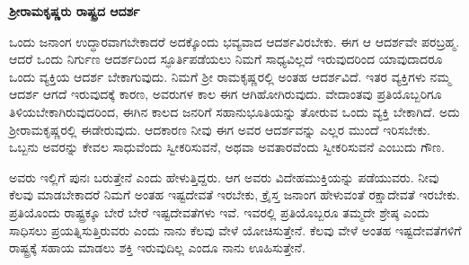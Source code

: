\vskip 5pt

\centerline{\textbf{ಶ‍್ರೀರಾಮಕೃಷ್ಣರು ರಾಷ್ಟ್ರದ ಆದರ್ಶ}}

\vskip 5pt

ಒಂದು ಜನಾಂಗ ಉದ್ಧಾರವಾಗಬೇಕಾದರೆ ಅದಕ್ಕೊಂದು ಭವ್ಯವಾದ ಆದರ್ಶವಿರಬೇಕು. ಈಗ ಆ ಆದರ್ಶವೇ ಪರಬ್ರಹ್ಮ. ಆದರೆ ಒಂದು ನಿರ್ಗುಣ ಆದರ್ಶದಿಂದ ಸ್ಫೂರ್ತಿಪಡೆಯಲು ನಿಮಗೆ ಸಾಧ್ಯವಿಲ್ಲದೆ ಇರುವುದರಿಂದ ಯಾವುದಾದರೂ ಒಂದು ವ್ಯಕ್ತಿಯ ಆದರ್ಶ ಬೇಕಾಗುವುದು. ನಿಮಗೆ ಶ‍್ರೀ ರಾಮಕೃಷ್ಣರಲ್ಲಿ ಅಂತಹ ಆದರ್ಶವಿದೆ. ಇತರ ವ್ಯಕ್ತಿಗಳು ನಮ್ಮ ಆದರ್ಶ ಆಗದೆ ಇರುವುದಕ್ಕೆ ಕಾರಣ, ಅವರುಗಳ ಕಾಲ ಈಗ ಆಗಿಹೋಗಿರುವುದು. ವೇದಾಂತವು ಪ್ರತಿಯೊಬ್ಬರಿಗೂ ತಿಳಿಯಬೇಕಾಗಿರುವುದರಿಂದ, ಈಗಿನ ಕಾಲದ ಜನರಿಗೆ ಸಹಾನುಭೂತಿಯನ್ನು ತೋರುವ ಒಂದು ವ್ಯಕ್ತಿ ಬೇಕಾಗಿದೆ. ಅದು ಶ‍್ರೀರಾಮಕೃಷ್ಣರಲ್ಲಿ ಈಡೇರುವುದು. ಆದಕಾರಣ ನೀವು ಈಗ ಅವರ ಆದರ್ಶವನ್ನು ಎಲ್ಲರ ಮುಂದೆ ಇರಿಸಬೇಕು. ಒಬ್ಬನು ಅವರನ್ನು ಕೇವಲ ಸಾಧುವೆಂದು ಸ್ವೀಕರಿಸುವನೆ, ಅಥವಾ ಅವತಾರವೆಂದು ಸ್ವೀಕರಿಸುವನೆ ಎಂಬುದು ಗೌಣ.

\eject

ಅವರು ಇಲ್ಲಿಗೆ ಪುನಃ ಬರುತ್ತೇನೆ ಎಂದು ಹೇಳುತ್ತಿದ್ದರು. ಆಗ ಅವರು ವಿದೇಹ\break ಮುಕ್ತಿಯನ್ನು ಪಡೆಯುವರು. ನೀವು ಕೆಲವು ಮಾಡಬೇಕಾದರೆ ನಿಮಗೆ ಅಂತಹ ಇಷ್ಟದೇವತೆ ಇರಬೇಕು, ಕ್ರೈಸ್ತ ಜನಾಂಗ ಹೇಳುವಂತೆ ರಕ್ಷಾದೇವತೆ ಇರಬೇಕು. ಪ್ರತಿಯೊಂದು ರಾಷ್ಟ್ರಕ್ಕೂ ಬೇರೆ ಬೇರೆ ಇಷ್ಟದೇವತೆಗಳು ಇವೆ. ಇವರಲ್ಲಿ ಪ್ರತಿಯೊಬ್ಬರೂ ತಮ್ಮದೇ ಶ್ರೇಷ್ಠ ಎಂದು ಸಾಧಿಸಲು ಪ್ರಯತ್ನಿಸುತ್ತಿರುವರು ಎಂದು ನಾನು ಕೆಲವು ವೇಳೆ ಯೋಚಿಸುತ್ತೇನೆ. ಕೆಲವು ವೇಳೆ ಅಂತಹ ಇಷ್ಟದೇವತೆಗಳಿಗೆ ರಾಷ್ಟ್ರಕ್ಕೆ ಸಹಾಯ ಮಾಡಲು ಶಕ್ತಿ ಇರುವುದಿಲ್ಲ ಎಂದೂ ನಾನು ಊಹಿಸುತ್ತೇನೆ.


